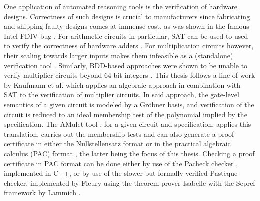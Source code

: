 One application of automated reasoning tools is the verification of hardware designs.
Correctness of such designs is crucial to manufacturers since fabricating and shipping faulty designs comes at immense cost, as was shown in the famous Intel FDIV-bug \cite{fdiv, fdiv-cost}.
For arithmetic circuits in particular, SAT can be used to used to verify the correctness of hardware adders \cite{Vampire2019:SAT_Computer_Algebra_Multipliers}.
For multiplication circuits however, their scaling towards larger inputs makes them infeasible as a (standalone) verification tool \cite{Vampire2019:SAT_Computer_Algebra_Multipliers, Kaufmann-column-wise-verification}.
Similarly, BDD-based approaches were shown to be unable to verify multiplier circuits beyond 64-bit integers \cite{bdd-bound}.
This thesis follows a line of work by Kaufmann et al. \cite{kaufmann-phd-thesis,amulet2, pac-2024} which applies an algebraic approach in combination with SAT to the verification of multiplier circuits.
In said approach, the gate-level semantics of a given circuit is modeled by a Gröbner basis, and verification of the circuit is reduced to an ideal membership test of the polynomial implied by the specification.
The AMulet tool \cite{amulet2}, for a given circuit and specification, applies this translation, carries out the membership tests and can also generate a proof certificate in either the Nullstellensatz format \cite{nullstellensatz} or in the practical algebraic calculus (PAC) format \cite{pac-2024}, the latter being the focus of this thesis.
Checking a proof certificate in PAC format can be done either by use of the Pacheck checker \cite{pac-2024}, implemented in C++, or by use of the slower but formally verified Pastèque checker, implemented by Fleury \cite{pac-2024} using the theorem prover Isabelle \cite{isabelle} with the Sepref framework by Lammich \cite{sepref}.

